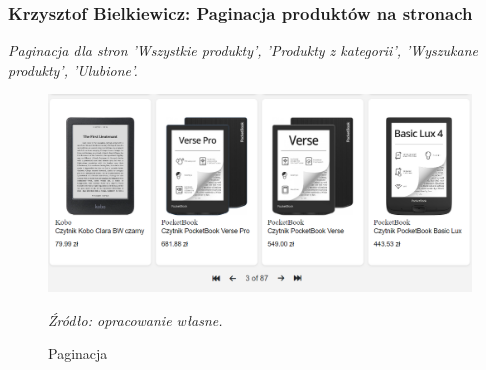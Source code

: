 \documentclass[12pt,a4paper,oneside]{article}
\theoremstyle{definition}
\numberwithin{equation}{section}
\begin{document}
\subsubsection{Krzysztof Bielkiewicz: Paginacja produktów na stronach}
\label{1.3.15}
\textit{Paginacja dla stron 'Wszystkie produkty', 'Produkty z kategorii', 'Wyszukane produkty', 'Ulubione'.}
\begin{figure}[H]
    \centering
    \includegraphics[width=1.0\columnwidth]{images/krzysztofBImages/pagination.png}
    \caption{Paginacja}
    \emph{Źródło: opracowanie własne.}
\end{figure}
\end{document}
